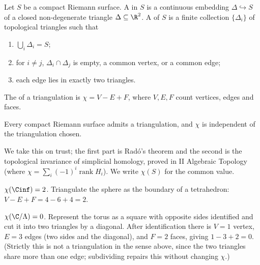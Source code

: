 \begin{definition}[Triangulation]
	Let $S$ be a compact Riemann surface. A  in $S$ is a
	continuous embedding $\Delta \hookrightarrow S$ of a closed non-degenerate triangle
	$\Delta \subseteq \R^2$. A  of $S$ is a finite collection
	$\{\Delta_i\}$ of topological triangles such that
	\begin{enumerate}[label=(\roman*)]
		\item $\bigcup_i \Delta_i = S$;
		\item for $i \neq j$, $\Delta_i \cap \Delta_j$ is empty, a common vertex, or a
		common edge;
		\item each edge lies in exactly two triangles.
	\end{enumerate}
\end{definition}

\begin{definition}
	The  of a triangulation is $\chi = V - E + F$, where $V, E,
	F$ count vertices, edges and faces.
\end{definition}

\begin{lemma}\label{lem:triangexists}
	Every compact Riemann surface admits a triangulation, and $\chi$ is independent of the
	triangulation chosen.
\end{lemma}

We take this on trust; the first part is Rad\'o's theorem and the second is the
topological invariance of simplicial homology, proved in II Algebraic Topology (where
$\chi = \sum_i (-1)^i \operatorname{rank} H_i$). We write $\chi(S)$ for the common value.

\begin{example}
	$\chi(\Cinf) = 2$. Triangulate the sphere as the boundary of a tetrahedron:
	$V - E + F = 4 - 6 + 4 = 2$.
\end{example}

\begin{example}
	$\chi(\C/\Lambda) = 0$. Represent the torus as a square with opposite sides identified
	and cut it into two triangles by a diagonal. After identification there is $V=1$ vertex,
	$E = 3$ edges (two sides and the diagonal), and $F = 2$ faces, giving
	$1 - 3 + 2 = 0$. (Strictly this is not a triangulation in the sense above, since the two
	triangles share more than one edge; subdividing repairs this without changing $\chi$.)
\end{example}

